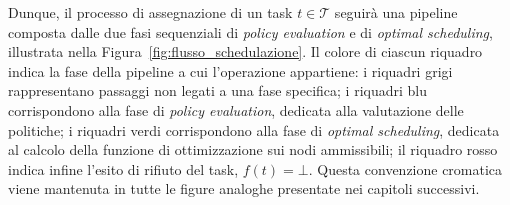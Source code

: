 Dunque, il processo di assegnazione di un task $t \in \mathcal{T}$ seguirà una pipeline composta dalle due fasi sequenziali di \emph{policy evaluation} e di \emph{optimal scheduling}, illustrata nella Figura~\ref{fig:flusso_schedulazione}. Il colore di ciascun riquadro indica la fase della pipeline a cui l'operazione appartiene: i riquadri grigi rappresentano passaggi non legati a una fase specifica; i riquadri blu corrispondono alla fase di \emph{policy evaluation}, dedicata alla valutazione delle politiche; i riquadri verdi corrispondono alla fase di \emph{optimal scheduling}, dedicata al calcolo della funzione di ottimizzazione sui nodi ammissibili; il riquadro rosso indica infine l'esito di rifiuto del task, $f(t) = \bot$. Questa convenzione cromatica viene mantenuta in tutte le figure analoghe presentate nei capitoli successivi.

